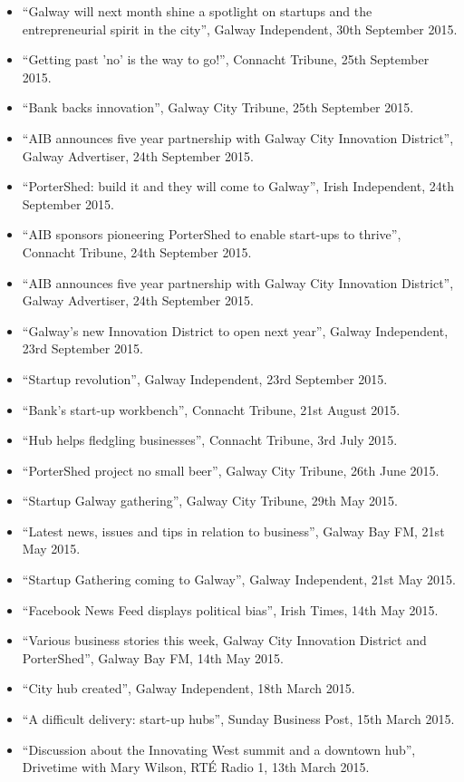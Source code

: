 \documentclass[10pt,a4paper]{res} %
\begin{document}
\begin{resume}
{\begin{itemize}
\item ``Galway will next month shine a spotlight on startups and the entrepreneurial spirit in the city'', Galway Independent, 30th September 2015.
\item ``Getting past 'no' is the way to go!'', Connacht Tribune, 25th September 2015.
\item ``Bank backs innovation'', Galway City Tribune, 25th September 2015.
\item ``AIB announces five year partnership with Galway City Innovation District'', Galway Advertiser, 24th September 2015.
\item ``PorterShed: build it and they will come to Galway'', Irish Independent, 24th September 2015.
\item ``AIB sponsors pioneering PorterShed to enable start-ups to thrive'', Connacht Tribune, 24th September 2015.
\item ``AIB announces five year partnership with Galway City Innovation District'', Galway Advertiser, 24th September 2015.
\item ``Galway's new Innovation District to open next year'', Galway Independent, 23rd September 2015.
\item ``Startup revolution'', Galway Independent, 23rd September 2015.
\item ``Bank's start-up workbench'', Connacht Tribune, 21st August 2015.
\item ``Hub helps fledgling businesses'', Connacht Tribune, 3rd July 2015.
\item ``PorterShed project no small beer'', Galway City Tribune, 26th June 2015.
\item ``Startup Galway gathering'', Galway City Tribune, 29th May 2015.
\item ``Latest news, issues and tips in relation to business'', Galway Bay FM, 21st May 2015.
\item ``Startup Gathering coming to Galway'', Galway Independent, 21st May 2015.
\item ``Facebook News Feed displays political bias'', Irish Times, 14th May 2015.
\item ``Various business stories this week, Galway City Innovation District and PorterShed'', Galway Bay FM, 14th May 2015.
\item ``City hub created'', Galway Independent, 18th March 2015.
\item ``A difficult delivery: start-up hubs'', Sunday Business Post, 15th March 2015.
\item ``Discussion about the Innovating West summit and a downtown hub'', Drivetime with Mary Wilson, RT\'{E} Radio 1, 13th March 2015.

\end{itemize}}
\end{resume}
\end{document}
